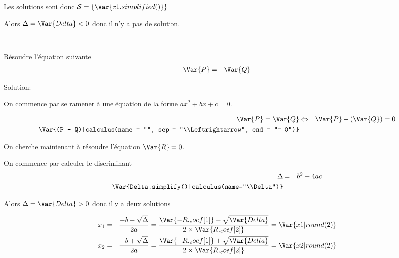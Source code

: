 \documentclass[a4paper,10pt]{article}
\begin{document}
    Les solutions sont donc $\mathcal{S} = \left\{ \Var{x1.simplified()}\right\}$

    Alors $\Delta = \Var{Delta} < 0$ donc il n'y a pas de solution.


    \bigskip
    ~\dotfill
    \bigskip
    
    
    Résoudre l'équation suivante
    \begin{eqnarray*}
        \Var{P} & = & \Var{Q}
    \end{eqnarray*}

    Solution:

    On commence par se ramener à une équation de la forme $ax^2+bx+c = 0$.

    \begin{eqnarray*}
        \Var{P} = \Var{Q} & \Leftrightarrow & \Var{P} - (\Var{Q}) = 0 \\
        \Var{(P - Q)|calculus(name = "", sep = "\\Leftrightarrow", end = "= 0")}
    \end{eqnarray*}

    On cherche maintenant à résoudre l'équation $\Var{R} = 0$.
    
    On commence par calculer le discriminant
    \begin{eqnarray*}
        \Delta & = & b^2-4ac \\
        \Var{Delta.simplify()|calculus(name="\\Delta")}
    \end{eqnarray*}

    Alors $\Delta = \Var{Delta} > 0$ donc il y a deux solutions


    \begin{eqnarray*}
        x_1 & = & \frac{-b - \sqrt{\Delta}}{2a} =  \frac{\Var{-R._coef[1]} - \sqrt{\Var{Delta}}}{2 \times \Var{R._coef[2]}} = \Var{x1 | round(2)} \\
        x_2 & = & \frac{-b + \sqrt{\Delta}}{2a} =  \frac{\Var{-R._coef[1]} + \sqrt{\Var{Delta}}}{2 \times \Var{R._coef[2]}} = \Var{x2 | round(2)}
    \end{eqnarray*}
\end{document}
